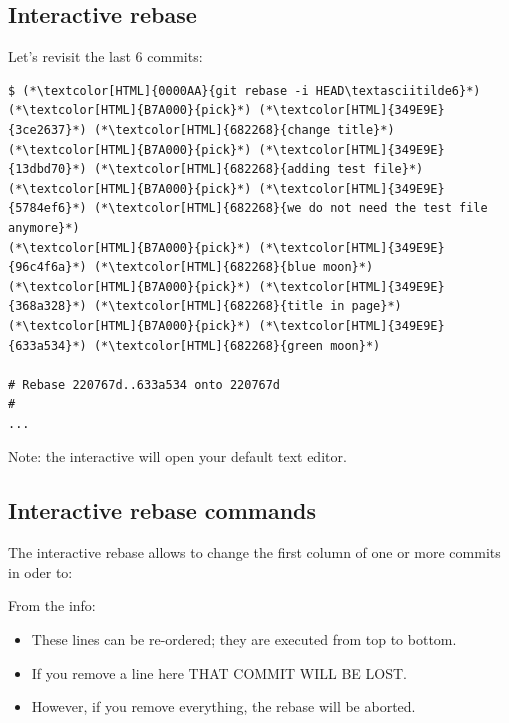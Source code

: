 \subsection{Interactive rebase}
\begin{frame}[fragile]
  \subslidetitle

  Let's revisit the last 6 commits:
  \begin{lstlisting}
$ (*\textcolor[HTML]{0000AA}{git rebase -i HEAD\textasciitilde6}*)
(*\textcolor[HTML]{B7A000}{pick}*) (*\textcolor[HTML]{349E9E}{3ce2637}*) (*\textcolor[HTML]{682268}{change title}*)
(*\textcolor[HTML]{B7A000}{pick}*) (*\textcolor[HTML]{349E9E}{13dbd70}*) (*\textcolor[HTML]{682268}{adding test file}*)
(*\textcolor[HTML]{B7A000}{pick}*) (*\textcolor[HTML]{349E9E}{5784ef6}*) (*\textcolor[HTML]{682268}{we do not need the test file anymore}*)
(*\textcolor[HTML]{B7A000}{pick}*) (*\textcolor[HTML]{349E9E}{96c4f6a}*) (*\textcolor[HTML]{682268}{blue moon}*)
(*\textcolor[HTML]{B7A000}{pick}*) (*\textcolor[HTML]{349E9E}{368a328}*) (*\textcolor[HTML]{682268}{title in page}*)
(*\textcolor[HTML]{B7A000}{pick}*) (*\textcolor[HTML]{349E9E}{633a534}*) (*\textcolor[HTML]{682268}{green moon}*)

# Rebase 220767d..633a534 onto 220767d
#
...
\end{lstlisting}
  \vspace{1em}
  Note: the interactive  will open your default text editor.
\end{frame}

\subsection{Interactive rebase commands}
\begin{frame}[fragile]
  \subslidetitle

  The interactive rebase allows to change the first column of one or more commits in oder to:

  \begin{itemize}
    \pause
    \pause
    \pause
    \pause
    \pause
  \end{itemize}

  \pause
  \vspace{1em}
  From the  info:
  \begin{itemize}
    \item These lines can be re-ordered; they are executed from top to bottom.
    \item If you remove a line here THAT COMMIT WILL BE LOST.
    \item However, if you remove everything, the rebase will be aborted.
  \end{itemize}

\end{frame}

